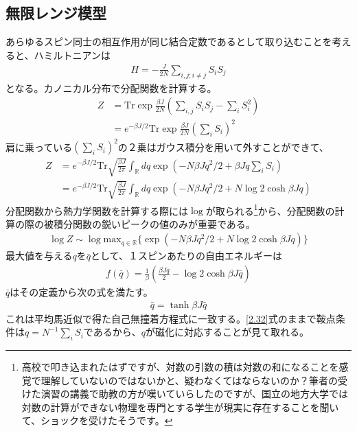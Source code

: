 \documentclass[autodetect-engine,dvipdfmx-if-dvi,ja=standard]{bxjsarticle}
\theoremstyle{break}
\begin{document}
        \subsection{無限レンジ模型}
            あらゆるスピン同士の相互作用が同じ結合定数であるとして取り込むことを考えると、ハミルトニアンは
            \begin{align}
                H=-\frac{J}{2N}\sum_{i,j;i\neq j}S_i S_j
            \end{align}
            となる。カノニカル分布で分配関数を計算する。
            \begin{align}
                Z&=\mathrm{Tr}\exp\frac{\beta J}{2N}\left(\sum_{i,j}S_i S_j -\sum_i S_i ^2\right)\\
                &=e^{-\beta J/2}\mathrm{Tr}\exp\frac{\beta J}{2N}\left(\sum_{i}S_i \right)^2
            \end{align}
            肩に乗っている$\left(\sum_{i}S_i \right)^2$の２乗はガウス積分を用いて外すことができて、
            \begin{align}
                Z&=e^{-\beta J/2}\mathrm{Tr}\sqrt{\frac{\beta J}{2\pi}}\int_{\mathbb{R}}dq \exp\left(-N\beta Jq^2 /2+\beta Jq \sum_i S_i\right)\label{2.32}\\
                &=e^{-\beta J/2}\mathrm{Tr}\sqrt{\frac{\beta J}{2\pi}}\int_{\mathbb{R}}dq \exp\left(-N\beta Jq^2 /2+N\log 2\cosh \beta J q\right)
            \end{align}
            分配関数から熱力学関数を計算する際には$\log$が取られる\footnote{高校で叩き込まれたはずですが、対数の引数の積は対数の和になることを感覚で理解していないのではないかと、疑わなくてはならないのか？筆者の受けた演習の講義で助教の方が嘆いていらしたのですが、国立の地方大学では対数の計算ができない物理を専門とする学生が現実に存在することを聞いて、ショックを受けたそうです。}から、分配関数の計算の際の被積分関数の鋭いピークの値のみが重要である。
            \begin{align}
                \log Z \sim \log \mathrm{max}_{q\in\mathbb{R}}\{\exp\left(-N\beta Jq^2 /2+N\log 2\cosh \beta J q\right)\}
            \end{align}
            最大値を与える$q$を$\bar{q}$として、１スピンあたりの自由エネルギーは
            \begin{align}
                f(\bar{q})=\frac{1}{\beta}\left(\frac{\beta J \bar{q}}{2}-\log 2\cosh \beta J \bar{q}\right)
            \end{align}
            $\bar{q}$はその定義から次の式を満たす。
            \begin{align}
                \bar{q}=\tanh \beta J\bar{q}
            \end{align}
            これは平均馬近似で得た自己無撞着方程式に一致する。\eqref{2.32}式のままで鞍点条件は$q=N^{-1}\sum_i S_i$であるから、$q$が磁化に対応することが見て取れる。
\end{document}
